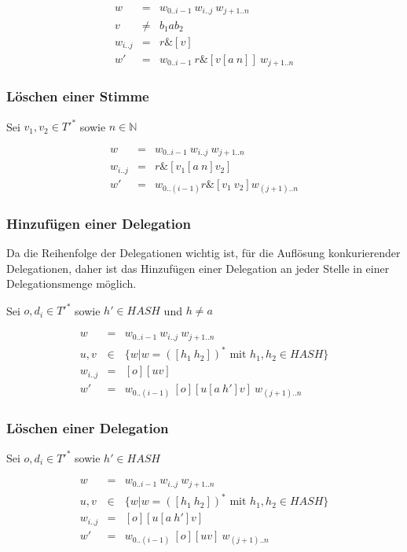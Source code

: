 \documentclass[a4paper,12pt]{report}
\begin{document}
\begin{eqnarray}
  w &=& w_{0 .. i-1}\ w_{i..j}\ w_{j+1 .. n} \\
  v &\neq& b_1 a b_2 \\
  w_{i..j} &=& r\& [v] \\
  w' &=& w_{0 .. i-1}\ r \& [v[a\ n]]\ w_{j+1 .. n}
\end{eqnarray}

\subsubsection*{Löschen einer Stimme}

Sei $v_1, v_2 \in T'^*$ sowie $n\in\mathbb{N}$

\begin{eqnarray}
  w &=& w_{0 .. i-1}\ w_{i..j}\ w_{j+1 .. n} \\
  w_{i..j}&=& r\& [v_1 [a\ n] v_2] \\
  w' &=& w_{0..(i-1)} r\& [v_1\ v_2] w_{(j+1)..n}
\end{eqnarray}


\subsubsection*{Hinzufügen einer Delegation}
Da die Reihenfolge der Delegationen wichtig ist, für die Auflösung konkurierender Delegationen, daher ist das Hinzufügen einer Delegation an jeder Stelle in einer Delegationsmenge möglich.

Sei $o,d_i \in T'^*$ sowie $h'\in HASH$ und $h\neq a$

\begin{eqnarray}
  w &=& w_{0 .. i-1}\ w_{i..j}\ w_{j+1 .. n} \\
  u,v &\in& \{ w | w = ([h_1\ h_2])^*\text{ mit } h_1,h_2 \in HASH \} \\
  w_{i..j} &=& [o][uv] \\
  w' &=& w_{0 .. (i-1)}\ [o][u[a\ h']v]\ w_{(j+1) .. n}
\end{eqnarray}

\subsubsection*{Löschen einer Delegation}

Sei $o,d_i \in T'^*$ sowie $h'\in HASH$

\begin{eqnarray}
  w &=& w_{0 .. i-1}\ w_{i..j}\ w_{j+1 .. n} \\
  u,v &\in& \{ w | w = ([h_1\ h_2])^*\text{ mit } h_1,h_2 \in HASH \} \\
  w_{i..j} &=& [o][u[a\ h']v] \\
  w' &=& w_{0 .. (i-1)}\ [o][uv]\ w_{(j+1) .. n}
\end{eqnarray}
\end{document}
